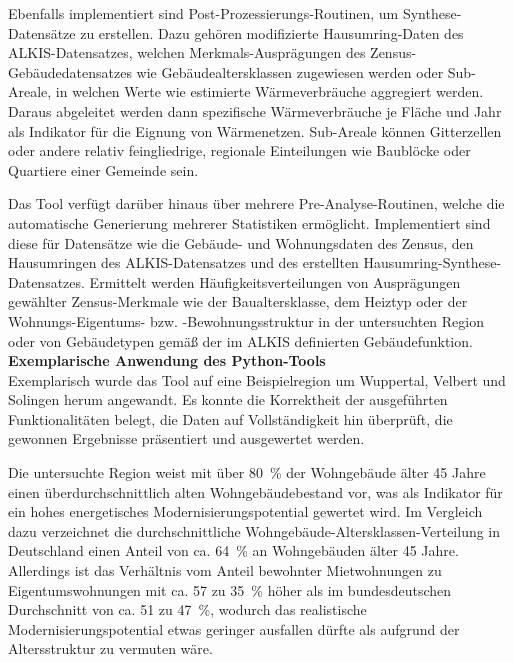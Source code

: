 		Ebenfalls implementiert sind Post-Prozessierungs-Routinen, um Synthese-Datensätze zu erstellen. Dazu gehören modifizierte Hausumring-Daten des ALKIS-Datensatzes, welchen Merkmals-Ausprägungen des Zensus-Gebäudedatensatzes wie Gebäudealtersklassen zugewiesen werden oder Sub-Areale, in welchen Werte wie estimierte Wärmeverbräuche aggregiert werden. Daraus abgeleitet werden dann spezifische Wärmeverbräuche je Fläche und Jahr als Indikator für die Eignung von Wärmenetzen. Sub-Areale können Gitterzellen oder andere relativ feingliedrige, regionale Einteilungen wie Baublöcke oder Quartiere einer Gemeinde sein. 
		
		Das Tool verfügt darüber hinaus über mehrere Pre-Analyse-Routinen, welche die automatische Generierung mehrerer Statistiken ermöglicht. Implementiert sind diese für Datensätze wie die Gebäude- und Wohnungsdaten des Zensus, den Hausumringen des ALKIS-Datensatzes und des erstellten Hausumring-Synthese-Datensatzes. Ermittelt werden Häufigkeitsverteilungen von Ausprägungen gewählter Zensus-Merkmale wie der Baualtersklasse, dem Heiztyp oder der Wohnungs-Eigentums- bzw. -Bewohnungsstruktur in der untersuchten Region oder von Gebäudetypen gemäß der im ALKIS definierten Gebäudefunktion. \\
		
		\textbf{Exemplarische Anwendung des Python-Tools}\\
		Exemplarisch wurde das Tool auf eine Beispielregion um Wuppertal, Velbert und Solingen herum angewandt. Es konnte die Korrektheit der ausgeführten Funktionalitäten belegt, die Daten auf Vollständigkeit hin überprüft, die gewonnen Ergebnisse präsentiert und ausgewertet werden. 
		
		Die untersuchte Region weist mit über 80~\% der Wohngebäude älter 45 Jahre einen überdurchschnittlich alten Wohngebäudebestand vor, was als Indikator für ein hohes energetisches Modernisierungspotential gewertet wird. Im Vergleich dazu verzeichnet die durchschnittliche Wohngebäude-Altersklassen-Verteilung in Deutschland einen Anteil von ca. 64~\% an Wohngebäuden älter 45 Jahre. Allerdings ist das Verhältnis vom Anteil bewohnter Mietwohnungen zu Eigentumswohnungen mit ca. 57 zu 35~\% höher als im bundesdeutschen Durchschnitt von ca. 51 zu 47~\%, wodurch das realistische Modernisierungspotential etwas geringer ausfallen dürfte als aufgrund der Altersstruktur zu vermuten wäre. 
		
